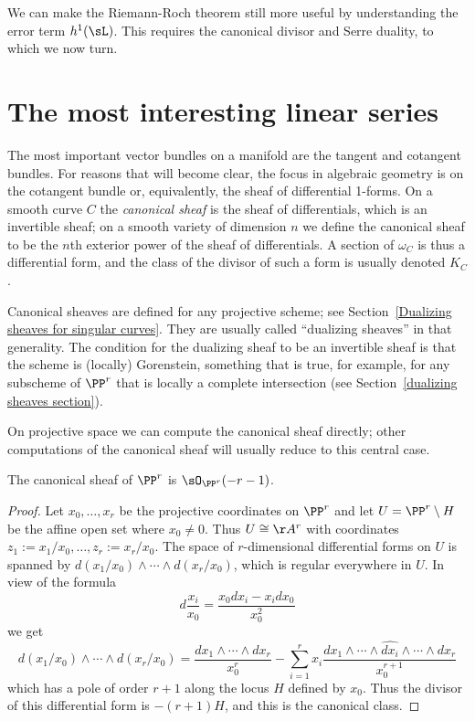 We can make the Riemann-Roch theorem still more useful by understanding the error term $h^1(\sL)$. This requires
the canonical divisor and Serre duality, to which
we now turn.


\section{The most interesting linear series}\label{most interesting}

The most important vector bundles on a manifold are the tangent and cotangent bundles. For reasons that
will become clear, the focus in algebraic geometry is on the cotangent bundle or, equivalently, the sheaf of differential 1-forms. On a smooth curve $C$ the \emph{canonical sheaf} is the sheaf of differentials, which is an 
invertible sheaf; on a smooth
variety of dimension $n$ we define the canonical sheaf to be the $n$th exterior power of the sheaf of differentials. A section of 
$\omega_C$ is thus a differential form, and the class of the divisor
of such a form is usually denoted $K_C$. 

\begin{fact}
Canonical sheaves are defined for any projective scheme; see Section~\ref{Dualizing sheaves for singular curves}. 
They are usually called ``dualizing sheaves'' in that generality. The condition for the dualizing sheaf to be an invertible
sheaf is that the scheme is (locally) Gorenstein, something that is true, for example, for any subscheme of $\PP^r$
that is locally a complete intersection (see Section~\ref{dualizing sheaves section}).
\end{fact}
 

On projective space we can compute the canonical sheaf directly; other computations of the canonical sheaf will usually reduce to this central case.

\begin{theorem}
 The canonical sheaf of $\PP^{r}$ is $\sO_{\PP^{r}}(-r-1)$. 
\end{theorem}
\begin{proof}
Let $x_{0}, \dots, x_{r}$ be the projective coordinates on $\PP^{r}$ and let  $U = \PP^{r}\setminus H$ be the affine open set where $x_{0} \neq 0$. Thus $U \cong \AA^{r}$ with coordinates $z_{1} := x_{1}/x_{0}, \dots, z_{r}:=x_{r}/x_{0}$. The space of $r$-dimensional differential forms on $U$ is spanned by $d(x_{1}/x_{0})\wedge\cdots\wedge d(x_{r}/x_{0})$, which is regular everywhere in $U$. In view of the formula
$$
d\frac{x_{i}}{x_{0}} = \frac{x_{0}dx_{i}-x_{i}dx_{0}}{x_{0}^{2}}
$$
we get
$$
d(x_{1}/x_{0})\wedge\cdots\wedge d(x_{r}/x_{0}) = \frac{dx_{1}\wedge\cdots\wedge dx_{r}}{x_{0}^{r}}-
\sum_{i=1}^{r} x_{i} \frac{ dx_{1}\wedge\cdots \wedge \widehat{dx_{i}}\wedge \cdots \wedge dx_{r}}{x_{0}^{r+1}}
$$
which has a pole of order $r+1$ along the locus $H$ defined by $x_{0}$. Thus the divisor of this differential form
is $-(r+1)H$, and this is the canonical class.
\end{proof}

